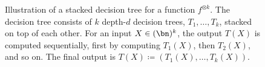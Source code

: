 \begin{figure}[h!]
{\begin{tikzpicture}[tips=proper]
    \end{tikzpicture}
    }
  \captionsetup{width=.9\linewidth}

    \caption{Illustration of a stacked decision tree for a function $f^{\otimes k}$. The decision tree consists of $k$ depth-$d$ decision trees, $T_1,\ldots, T_k$, stacked on top of each other. For an input $X \in (\bn)^k$, the output $T(X)$ is computed sequentially, first by computing $T_1(X)$, then $T_2(X)$, and so on. The final output is $T(X)\coloneqq (T_1(X),\ldots, T_k(X))$. }
    \label{fig:stacked}
\end{figure}
